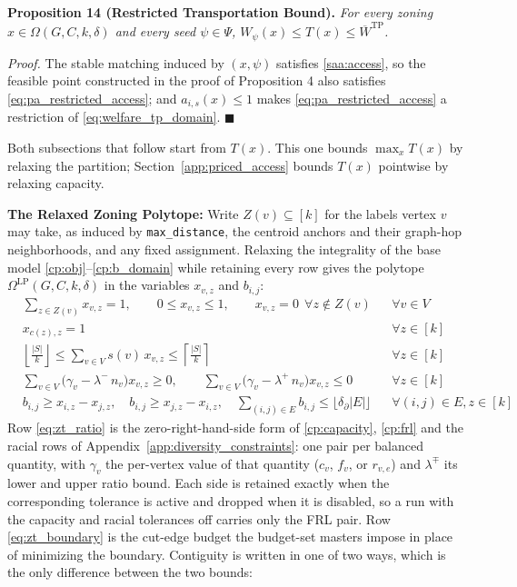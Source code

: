 \documentclass{article}
\begin{document}
\noindent\textbf{Proposition 14 (Restricted Transportation Bound).} \textit{For every zoning $x \in \Omega(G, C, k, \delta)$ and every seed $\psi \in \Psi$, $W_\psi(x) \leq T(x) \leq \overline{W}^{\mathrm{TP}}$.}

\textit{Proof.} The stable matching induced by $(x, \psi)$ satisfies \eqref{saa:access}, so the feasible point constructed in the proof of Proposition 4 also satisfies \eqref{eq:pa_restricted_access}; and $a_{i,s}(x) \leq 1$ makes \eqref{eq:pa_restricted_access} a restriction of \eqref{eq:welfare_tp_domain}. $\blacksquare$

Both subsections that follow start from $T(x)$. This one bounds $\max_x T(x)$ by relaxing the partition; Section~\ref{app:priced_access} bounds $T(x)$ pointwise by relaxing capacity.

\noindent\textbf{The Relaxed Zoning Polytope:}
Write $Z(v) \subseteq [k]$ for the labels vertex $v$ may take, as induced by \texttt{max\_distance}, the centroid anchors and their graph-hop neighborhoods, and any fixed assignment. Relaxing the integrality of the base model \eqref{cp:obj}--\eqref{cp:b_domain} while retaining every row gives the polytope $\Omega^{\mathrm{LP}}(G, C, k, \delta)$ in the variables $x_{v,z}$ and $b_{i,j}$:
\begin{align}
& \sum_{z \in Z(v)} x_{v,z} = 1, \qquad 0 \leq x_{v,z} \leq 1, \qquad x_{v,z} = 0 \ \ \forall z \notin Z(v) && \forall v \in V \label{eq:zt_assign} \\
& x_{c(z), z} = 1 && \forall z \in [k] \label{eq:zt_anchor} \\
& \left\lfloor \tfrac{|S|}{k} \right\rfloor \leq \sum_{v \in V} s(v)\, x_{v,z} \leq \left\lceil \tfrac{|S|}{k} \right\rceil && \forall z \in [k] \label{eq:zt_schools} \\
& \sum_{v \in V} \big( \gamma_v - \lambda^-\, n_v \big) x_{v,z} \geq 0, \qquad \sum_{v \in V} \big( \gamma_v - \lambda^+\, n_v \big) x_{v,z} \leq 0 && \forall z \in [k] \label{eq:zt_ratio} \\
& b_{i,j} \geq x_{i,z} - x_{j,z}, \quad b_{i,j} \geq x_{j,z} - x_{i,z}, \quad \sum_{(i,j) \in E} b_{i,j} \leq \lfloor \delta_\partial |E| \rfloor && \forall (i,j) \in E, z \in [k] \label{eq:zt_boundary}
\end{align}
Row \eqref{eq:zt_ratio} is the zero-right-hand-side form of \eqref{cp:capacity}, \eqref{cp:frl} and the racial rows of Appendix~\ref{app:diversity_constraints}: one pair per balanced quantity, with $\gamma_v$ the per-vertex value of that quantity ($c_v$, $f_v$, or $r_{v,e}$) and $\lambda^\mp$ its lower and upper ratio bound. Each side is retained exactly when the corresponding tolerance is active and dropped when it is disabled, so a run with the capacity and racial tolerances off carries only the FRL pair. Row \eqref{eq:zt_boundary} is the cut-edge budget the budget-set masters impose in place of minimizing the boundary. Contiguity is written in one of two ways, which is the only difference between the two bounds:
\end{document}
